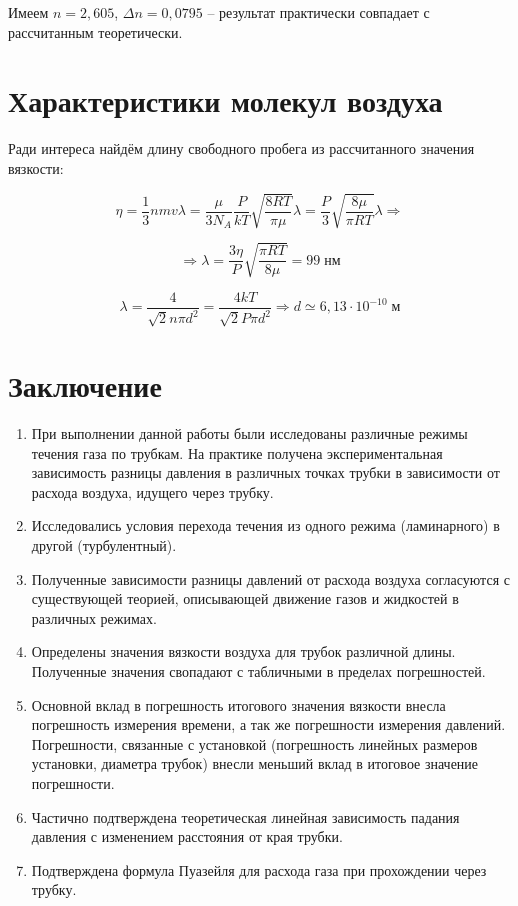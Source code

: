 \documentclass[a4paper, 12pt]{article} %
\begin{document}
Имеем $n = 2,605$, $\Delta n = 0,0795$ -- результат практически совпадает с рассчитанным теоретически. 

\newpage 

\section{Характеристики молекул воздуха}

Ради интереса найдём длину свободного пробега из рассчитанного значения вязкости:

\begin{equation}
	\eta = \frac{1}{3}nmv \lambda = \frac{\mu}{3 N_{A}} \frac{P}{kT} \sqrt{\frac{8RT}{\pi \mu}} \lambda = \frac{P}{3}  \sqrt{\frac{8 \mu}{\pi RT}} \lambda \Rightarrow
\end{equation}

\begin{equation}
	\Rightarrow \lambda = \frac{3 \eta}{P} \sqrt{\frac{\pi RT}{8 \mu}} = 99 \; \text{нм}
\end{equation}

\begin{equation}
	\lambda = \frac{4}{\sqrt{2} n \pi d^2} = \frac{4kT}{\sqrt{2} P \pi d^2} \Rightarrow d \simeq 6,13 \cdot 10^{-10} \; \text{м}
\end{equation}



\section{Заключение}

\begin{enumerate}
	\item При выполнении данной работы были исследованы различные режимы течения газа по трубкам. На практике получена экспериментальная зависимость разницы давления в различных точках трубки в зависимости от расхода воздуха, идущего через трубку.
	\item Исследовались условия перехода течения из одного режима (ламинарного) в другой (турбулентный).
	\item Полученные зависимости разницы давлений от расхода воздуха согласуются с существующей теорией, описывающей движение газов и жидкостей в различных режимах.
	\item Определены значения вязкости воздуха для трубок различной длины. Полученные значения свопадают с табличными в пределах погрешностей.
	\item Основной вклад в погрешность итогового значения вязкости внесла погрешность измерения времени, а так же погрешности измерения давлений. Погрешности, связанные с установкой (погрешность линейных размеров установки, диаметра трубок) внесли меньший вклад в итоговое значение погрешности.
	\item Частично подтверждена теоретическая линейная зависимость падания давления с изменением расстояния от края трубки.
	\item Подтверждена формула Пуазейля для расхода газа при прохождении через трубку.
\end{enumerate}
\end{document}
